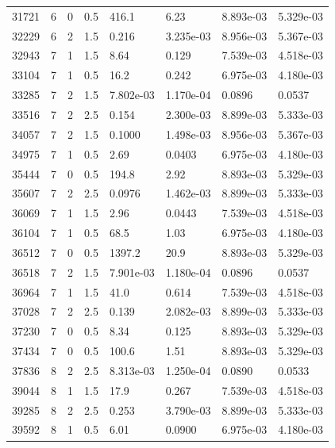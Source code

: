 \documentclass[preview]{standalone}
\begin{document}
{{{\begin{tabular}{L{1.2cm}C{1.2cm} C{0.3cm}C{0.5cm} C{1.4cm}C{1.4cm} C{1.4cm}C{1.4cm}}
  31721  &     6  & 0     & 0.5 &  416.1  & 6.23  & 8.893e-03 &  5.329e-03   \\ 
  32229  &     6  & 2     & 1.5 &  0.216  & 3.235e-03  & 8.956e-03 &  5.367e-03   \\ 
  32943  &     7  & 1     & 1.5 &  8.64  & 0.129  & 7.539e-03 &  4.518e-03   \\ 
  33104  &     7  & 1     & 0.5 &  16.2  & 0.242  & 6.975e-03 &  4.180e-03   \\ 
  33285  &     7  & 2     & 1.5 &  7.802e-03  & 1.170e-04  & 0.0896 &  0.0537   \\ 
  33516  &     7  & 2     & 2.5 &  0.154  & 2.300e-03  & 8.899e-03 &  5.333e-03   \\ 
  34057  &     7  & 2     & 1.5 &  0.1000  & 1.498e-03  & 8.956e-03 &  5.367e-03   \\ 
  34975  &     7  & 1     & 0.5 &  2.69  & 0.0403  & 6.975e-03 &  4.180e-03   \\ 
  35444  &     7  & 0     & 0.5 &  194.8  & 2.92  & 8.893e-03 &  5.329e-03   \\ 
  35607  &     7  & 2     & 2.5 &  0.0976  & 1.462e-03  & 8.899e-03 &  5.333e-03   \\ 
  36069  &     7  & 1     & 1.5 &  2.96  & 0.0443  & 7.539e-03 &  4.518e-03   \\ 
  36104  &     7  & 1     & 0.5 &  68.5  & 1.03  & 6.975e-03 &  4.180e-03   \\ 
  36512  &     7  & 0     & 0.5 &  1397.2  & 20.9  & 8.893e-03 &  5.329e-03   \\ 
  36518  &     7  & 2     & 1.5 &  7.901e-03  & 1.180e-04  & 0.0896 &  0.0537   \\ 
  36964  &     7  & 1     & 1.5 &  41.0  & 0.614  & 7.539e-03 &  4.518e-03   \\ 
  37028  &     7  & 2     & 2.5 &  0.139  & 2.082e-03  & 8.899e-03 &  5.333e-03   \\ 
  37230  &     7  & 0     & 0.5 &  8.34  & 0.125  & 8.893e-03 &  5.329e-03   \\ 
  37434  &     7  & 0     & 0.5 &  100.6  & 1.51  & 8.893e-03 &  5.329e-03   \\ 
  37836  &     8  & 2     & 2.5 &  8.313e-03  & 1.250e-04  & 0.0890 &  0.0533   \\ 
  39044  &     8  & 1     & 1.5 &  17.9  & 0.267  & 7.539e-03 &  4.518e-03   \\ 
  39285  &     8  & 2     & 2.5 &  0.253  & 3.790e-03  & 8.899e-03 &  5.333e-03   \\ 
  39592  &     8  & 1     & 0.5 &  6.01  & 0.0900  & 6.975e-03 &  4.180e-03   \\ 

\end{tabular}}}}
\end{document}

